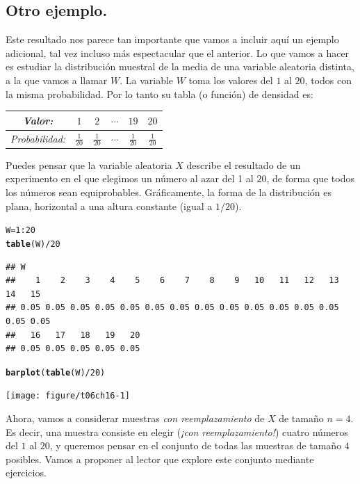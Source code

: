 \documentclass[10pt,a4paper]{article}\usepackage[]{graphicx}\usepackage[]{color}
\makeatletter
\newcommand{\hlnum}[1]{\textcolor[rgb]{0.686,0.059,0.569}{#1}}%
\newcommand{\hlopt}[1]{\textcolor[rgb]{0,0,0}{#1}}%
\newcommand{\hlstd}[1]{\textcolor[rgb]{0.345,0.345,0.345}{#1}}%
\newcommand{\hlkwb}[1]{\textcolor[rgb]{0.69,0.353,0.396}{#1}}%
\newcommand{\hlkwd}[1]{\textcolor[rgb]{0.737,0.353,0.396}{\textbf{#1}}}%
\newenvironment{kframe}{%
 \def\at@end@of@kframe{}%
 \ifinner\ifhmode%
  \def\at@end@of@kframe{\end{minipage}}%
  \begin{minipage}{\columnwidth}%
 \fi\fi%
 \def\FrameCommand##1{\hskip\@totalleftmargin \hskip-\fboxsep
 \colorbox{shadecolor}{##1}\hskip-\fboxsep
     \hskip-\linewidth \hskip-\@totalleftmargin \hskip\columnwidth}%
 \MakeFramed {\advance\hsize-\width
   \@totalleftmargin\z@ \linewidth\hsize
   \@setminipage}}%
 {\par\unskip\endMakeFramed%
 \at@end@of@kframe}
\newenvironment{knitrout}{}{} %
\makeatother
\begin{document}
\subsection{Otro ejemplo.}
\label{tut06:subsec:OtroEjemplo}

Este resultado nos parece tan importante que vamos a incluir aquí un ejemplo adicional, tal vez incluso más espectacular que el anterior. Lo que vamos a hacer es estudiar la distribución muestral de la media de una variable aleatoria distinta, a la que vamos a llamar $W$. La variable $W$ toma los valores del $1$ al $20$, todos con la misma probabilidad. Por lo tanto su tabla (o función) de densidad es:
    \begin{center}
    \begin{tabular}[c]{|c|c|c|c|c|c|}
    \hline
    {\em Valor:}&$1$&$2$&$\cdots$&$19$&$20$\\
    \hline
    {\em Probabilidad:}\rule{0cm}{0.5cm}& $\frac{1}{20}$&$\frac{1}{20}$&$\cdots$&$\frac{1}{20}$&$\frac{1}{20}$\\[2mm]
    \hline
    \end{tabular}
    \end{center}
Puedes pensar que la variable aleatoria $X$ describe el resultado de un experimento en el que elegimos un número al azar del 1 al $20$, de forma que todos los números sean equiprobables. Gráficamente, la forma de la distribución es plana, horizontal a una altura constante (igual a $1/20$).
\begin{knitrout}
\color{fgcolor}\begin{kframe}
\begin{alltt}
\hlstd{W} \hlkwb{=} \hlnum{1}\hlopt{:}\hlnum{20}
\hlkwd{table}\hlstd{(W)}\hlopt{/}\hlnum{20}
\end{alltt}
\begin{verbatim}
## W
##    1    2    3    4    5    6    7    8    9   10   11   12   13   14   15 
## 0.05 0.05 0.05 0.05 0.05 0.05 0.05 0.05 0.05 0.05 0.05 0.05 0.05 0.05 0.05 
##   16   17   18   19   20 
## 0.05 0.05 0.05 0.05 0.05
\end{verbatim}
\begin{alltt}
\hlkwd{barplot}\hlstd{(}\hlkwd{table}\hlstd{(W)}\hlopt{/}\hlnum{20}\hlstd{)}
\end{alltt}
\end{kframe}
\texttt{[image: figure/t06ch16-1]} 

\end{knitrout}
Ahora, vamos a considerar muestras {\em con reemplazamiento} de $X$ de tamaño $n=4$. Es decir, una muestra consiste en elegir ({\em ¡con reemplazamiento!}) cuatro números del $1$ al $20$, y queremos pensar en el conjunto de todas las muestras de tamaño $4$ posibles. Vamos a proponer al lector que explore este conjunto mediante ejercicios.
\end{document}
